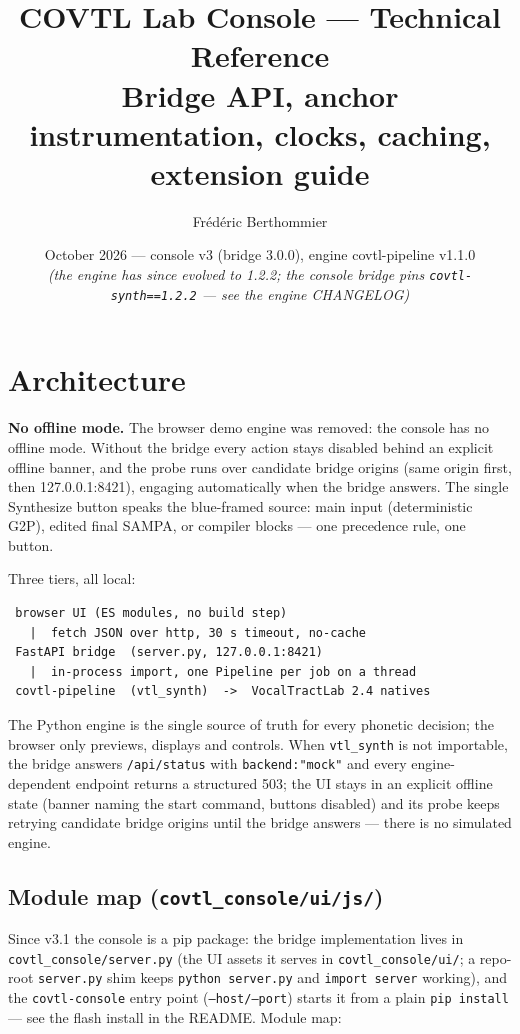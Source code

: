 \documentclass[11pt,a4paper]{article}
\title{COVTL Lab Console --- Technical Reference\\[4pt]\large Bridge API, anchor instrumentation, clocks, caching, extension guide}
\author{Fr\'ed\'eric Berthommier}
\date{October 2026 --- console v3 (bridge 3.0.0), engine covtl-pipeline v1.1.0\\[0.2em]\footnotesize\textit{(the engine has since evolved to 1.2.2; the console bridge pins \texttt{covtl-synth==1.2.2} --- see the engine CHANGELOG)}}
\begin{document}
\maketitle
\tableofcontents
\vspace{1em}

\section{Architecture}


\textbf{No offline mode.} The browser demo engine was removed: the console has no offline mode. Without the bridge every action stays disabled behind an explicit offline banner, and the probe runs over candidate bridge origins (same origin first, then 127.0.0.1:8421), engaging automatically when the bridge answers. The single Synthesize button speaks the blue-framed source: main input
(deterministic G2P), edited final SAMPA, or compiler blocks --- one
precedence rule, one button.

Three tiers, all local:

\begin{verbatim}
 browser UI (ES modules, no build step)
   |  fetch JSON over http, 30 s timeout, no-cache
 FastAPI bridge  (server.py, 127.0.0.1:8421)
   |  in-process import, one Pipeline per job on a thread
 covtl-pipeline  (vtl_synth)  ->  VocalTractLab 2.4 natives
\end{verbatim}

The Python engine is the single source of truth for every phonetic
decision; the browser only previews, displays and controls. When
\texttt{vtl\_synth} is not importable, the bridge answers
\texttt{/api/status} with \texttt{backend:"mock"} and every
engine-dependent endpoint returns a structured 503; the UI stays in an
explicit offline state (banner naming the start command, buttons
disabled) and its probe keeps retrying candidate bridge origins until
the bridge answers --- there is no simulated engine.

\subsection{Module map (\texttt{covtl\_console/ui/js/})}

Since v3.1 the console is a pip package: the bridge implementation
lives in \texttt{covtl\_console/server.py} (the UI assets it serves in
\texttt{covtl\_console/ui/}; a repo-root \texttt{server.py} shim keeps
\texttt{python server.py} and \texttt{import server} working), and the
\texttt{covtl-console} entry point (\texttt{--host/--port}) starts it
from a plain \texttt{pip install} — see the flash install in the
README. Module map:
\end{document}
